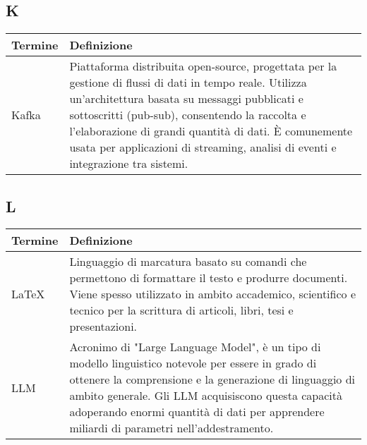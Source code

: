 \documentclass[10pt]{article}
\begin{document}
\subsection{K} %
\begin{longtable}{|>{\centering\arraybackslash}m{2.5cm}|>{\arraybackslash}m{12.5cm}|}
\hline
\rowcolor[gray]{0.8}
\textbf{Termine} & \textbf{Definizione}\\
\endhead
\hline
Kafka & Piattaforma distribuita open-source, progettata per la gestione di flussi di dati in tempo reale. Utilizza un'architettura basata su messaggi pubblicati e sottoscritti (pub-sub), consentendo la raccolta e l'elaborazione di grandi quantità di dati. È comunemente usata per applicazioni di streaming, analisi di eventi e integrazione tra sistemi.\\
\hline
\end{longtable}

\subsection{L} %
\begin{longtable}{|>{\centering\arraybackslash}m{2.5cm}|>{\arraybackslash}m{12.5cm}|}
\hline
\rowcolor[gray]{0.8}
\textbf{Termine} & \textbf{Definizione}\\
\endhead
\hline
\LaTeX & Linguaggio di marcatura basato su comandi che permettono di formattare il testo e produrre documenti. Viene spesso utilizzato in ambito accademico, scientifico e tecnico per la scrittura di articoli, libri, tesi e presentazioni.\\
\hline
LLM & Acronimo di "Large Language Model", è un tipo di modello linguistico notevole per essere in grado di ottenere la comprensione e la generazione di linguaggio di ambito generale. Gli LLM acquisiscono questa capacità adoperando enormi quantità di dati per apprendere miliardi di parametri nell'addestramento.\\
\hline
\end{longtable}
\end{document}
